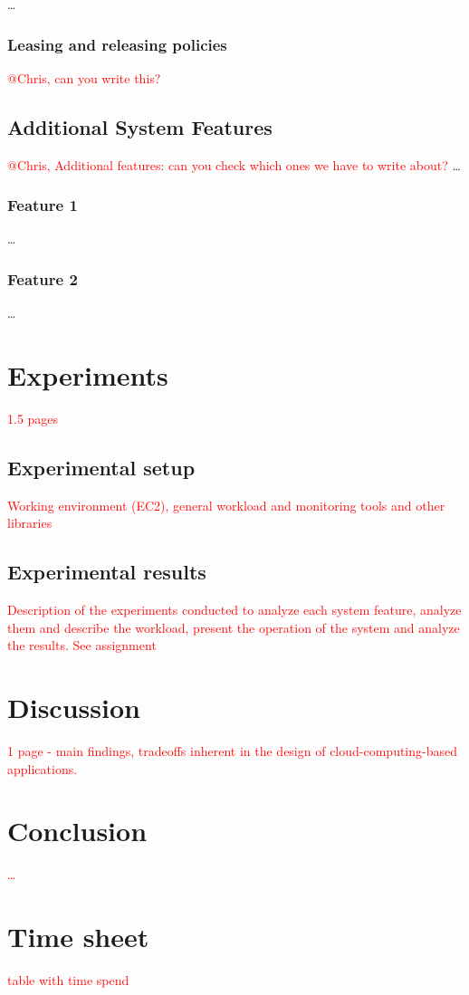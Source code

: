 \documentclass{stylesheet}
\begin{document}
\ldots

\subsubsection*{Leasing and releasing policies}
\textcolor{red}{@Chris, can you write this?}


\subsection{Additional System Features}
\label{subsec:additionalFeatures}
\textcolor{red}{@Chris, Additional features: can you check which ones we have to write about?}
\ldots
\subsubsection{Feature 1}
\ldots
\subsubsection{Feature 2}
\ldots

\section{Experiments}
\label{sec:experiments}
\textcolor{red}{1.5 pages}
\subsection{Experimental setup}
\label{subsec:setup}
\textcolor{red}{Working environment (EC2), general workload and monitoring tools and other libraries}

\subsection{Experimental results}
\label{subsec:results}
\textcolor{red}{Description of the experiments conducted to analyze each system feature, analyze them and describe the workload, present the operation of the system and analyze the results. See assignment}

\section{Discussion}
\label{sec:discussion}
\textcolor{red}{1 page - main findings, tradeoffs inherent in the design of cloud-computing-based applications.}

\section{Conclusion}
\label{sec:conclusion}
\textcolor{red}{\ldots}




\appendix
\section{Time sheet}
\label{app:time}
\textcolor{red}{table with time spend}
\end{document}
